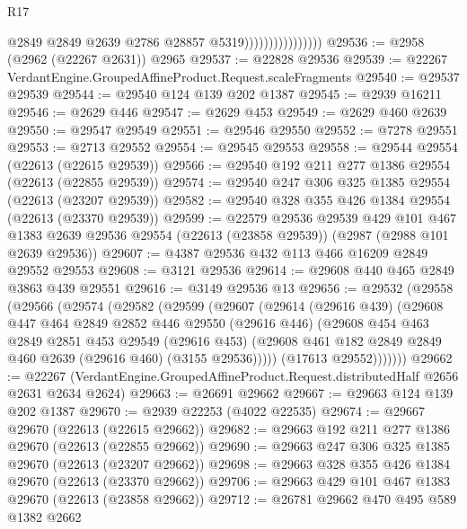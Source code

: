 \begin{lexlean}{R17}
\begin{coremodule}
                                    @2849
                                    @2849
                                    @2639
                                    @2786
                                    @28857
                                    @5319))))))))))))))))
@29536 := @2958 (@2962 (@22267 @2631)) @2965
@29537 := @22828 @29536
@29539 := @22267 VerdantEngine.GroupedAffineProduct.Request.scaleFragments
@29540 := @29537 @29539
@29544 := @29540 @124 @139 @202 @1387
@29545 := @2939 @16211
@29546 := @2629 @446
@29547 := @2629 @453
@29549 := @2629 @460 @2639
@29550 := @29547 @29549
@29551 := @29546 @29550
@29552 := @7278 @29551
@29553 := @2713 @29552
@29554 := @29545 @29553
@29558 := @29544 @29554 (@22613 (@22615 @29539))
@29566 := @29540 @192 @211 @277 @1386 @29554 (@22613 (@22855 @29539))
@29574 := @29540 @247 @306 @325 @1385 @29554 (@22613 (@23207 @29539))
@29582 := @29540 @328 @355 @426 @1384 @29554 (@22613 (@23370 @29539))
@29599 := @22579
    @29536
    @29539
    @429
    @101
    @467
    @1383
    @2639
    @29536
    @29554
    (@22613 (@23858 @29539))
    (@2987 (@2988 @101 @2639 @29536))
@29607 := @4387 @29536 @432 @113 @466 @16209 @2849 @29552 @29553
@29608 := @3121 @29536
@29614 := @29608 @440 @465 @2849 @3863 @439 @29551
@29616 := @3149 @29536 @13
@29656 := @29532
    (@29558
      (@29566
        (@29574
          (@29582
            (@29599
              (@29607
                (@29614
                  (@29616 @439)
                  (@29608
                    @447
                    @464
                    @2849
                    @2852
                    @446
                    @29550
                    (@29616 @446)
                    (@29608
                      @454
                      @463
                      @2849
                      @2851
                      @453
                      @29549
                      (@29616 @453)
                      (@29608 @461 @182 @2849 @2849 @460 @2639 (@29616 @460) (@3155 @29536)))))
                (@17613 @29552)))))))
@29662 := @22267
    (VerdantEngine.GroupedAffineProduct.Request.distributedHalf @2656 @2631 @2634 @2624)
@29663 := @26691 @29662
@29667 := @29663 @124 @139 @202 @1387
@29670 := @2939 @22253 (@4022 @22535)
@29674 := @29667 @29670 (@22613 (@22615 @29662))
@29682 := @29663 @192 @211 @277 @1386 @29670 (@22613 (@22855 @29662))
@29690 := @29663 @247 @306 @325 @1385 @29670 (@22613 (@23207 @29662))
@29698 := @29663 @328 @355 @426 @1384 @29670 (@22613 (@23370 @29662))
@29706 := @29663 @429 @101 @467 @1383 @29670 (@22613 (@23858 @29662))
@29712 := @26781 @29662 @470 @495 @589 @1382 @2662

\end{coremodule}
\end{lexlean}
